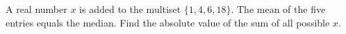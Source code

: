 A real number $x$ is added to the multiset $\{1,4,6,18\}$. The mean of the five entries equals the median. Find the absolute value of the sum of all possible $x$.
